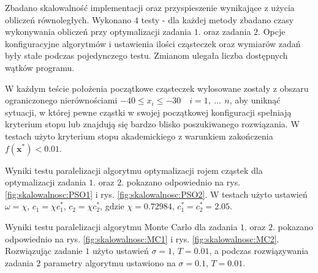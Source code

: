 \documentclass[11pt, a4paper, oneside]{article}
\newcommand{\vect}[1]{\bm{\mathbf{#1}}}
\begin{document}
Zbadano skalowalność implementacji oraz przyspieszenie wynikające z użycia obliczeń równoległych. Wykonano $4$ testy - dla każdej metody zbadano czasy wykonywania obliczeń przy optymalizacji zadania $1$. oraz zadania $2$. Opcje konfiguracyjne algorytmów i ustawienia ilości cząsteczek oraz wymiarów zadań były stałe podczas pojedynczego testu. Zmianom ulegała liczba dostępnych wątków programu.

W każdym teście położenia początkowe cząsteczek wylosowane zostały z obszaru ograniczonego nierównościami $-40 \leq x_i \leq -30 \quad i = 1, \ ...\, \ n$, aby uniknąć sytuacji, w której pewne cząstki w swojej początkowej konfiguracji spełniają kryterium stopu lub znajdują się bardzo blisko poszukiwanego rozwiązania. W testach użyto kryterium stopu akademickiego z warunkiem zakończenia $f\left(\vect{x}^{*}\right) < 0.01$.

Wyniki testu paralelizacji algorytmu optymalizacji rojem cząstek dla optymalizacji zadania $1$. oraz $2$. pokazano odpowiednio na rys. \ref{fig:skalowalnosc:PSO1} i rys. \ref{fig:skalowalnosc:PSO2}. W testach użyto ustawień $\omega = \chi$, $c_1 = \chi c_1^*$, $c_2 = \chi c_2^*$, gdzie $\chi = 0.72984$, $c_1^* = c_2^* = 2.05$.

Wyniki testu paralelizacji algorytmu Monte Carlo dla zadania $1$. oraz $2$. pokazano odpowiednio na rys. \ref{fig:skalowalnosc:MC1} i rys. \ref{fig:skalowalnosc:MC2}. Rozwiązując zadanie $1$ użyto ustawień $\sigma = 1$, $T = 0.01$, a podczas rozwiązywania zadania $2$ parametry algorytmu ustawiono na $\sigma = 0.1$, $T = 0.01$.
\end{document}
